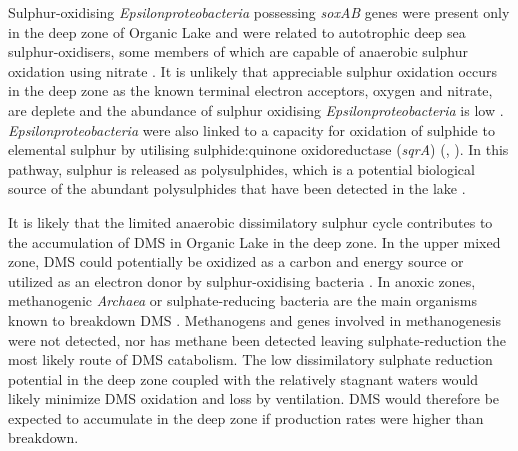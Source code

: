 Sulphur-oxidising \emph{Epsilonproteobacteria} possessing \emph{soxAB} genes  were present only in the deep zone of Organic Lake  and were related to autotrophic deep sea sulphur-oxidisers, some members of which are capable of anaerobic sulphur oxidation using nitrate \cite{Yamamoto2011}. 
It is unlikely that appreciable sulphur oxidation occurs in the deep zone as the known terminal electron acceptors, oxygen and nitrate, are deplete and the abundance of sulphur oxidising \emph{Epsilonproteobacteria} is low . 
\emph{Epsilonproteobacteria} were also linked to a capacity for oxidation of sulphide to elemental sulphur by utilising sulphide:quinone oxidoreductase (\emph{sqrA}) (, ). 
In this pathway, sulphur is released as polysulphides, which is a potential biological source of the abundant polysulphides that have been detected in the lake \cite{Roberts1993b}.

It is likely that the limited anaerobic dissimilatory sulphur cycle contributes to the accumulation of \ac{DMS} in Organic Lake in the deep zone.
In the upper mixed zone, \ac{DMS} could potentially be oxidized as a carbon and energy source or utilized as an electron donor by sulphur-oxidising bacteria \cite{Schafer2010}. 
In anoxic zones, methanogenic \emph{Archaea} or sulphate-reducing bacteria are the main organisms known to breakdown \ac{DMS} \cite{Schafer2010}. 
Methanogens and genes involved in methanogenesis were not detected, nor has methane been detected \cite{Gibson1994} leaving sulphate-reduction the most likely route of \ac{DMS} catabolism. 
The low dissimilatory sulphate reduction potential in the deep zone coupled with the relatively stagnant waters would likely minimize \ac{DMS} oxidation and loss by ventilation. \ac{DMS} would therefore be expected to accumulate in the deep zone if production rates were higher than breakdown.

